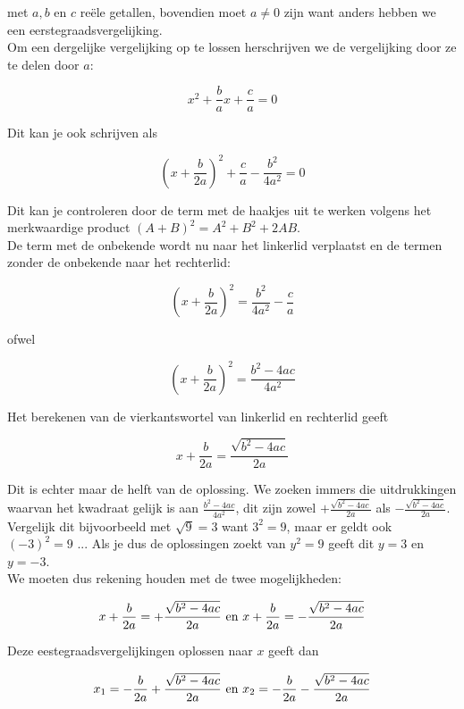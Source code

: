 met $a,b$ en $c$ re\"{e}le getallen, bovendien moet $a \neq 0$ zijn want anders hebben we een eerstegraadsvergelijking.\\
Om een dergelijke vergelijking op te lossen herschrijven we de vergelijking door ze te delen door $a$:

\[ x^2 + \frac{b}{a}x + \frac{c}{a} = 0 \]

Dit kan je ook schrijven als

\[ (x+ \frac{b}{2a})^2 + \frac{c}{a} - \frac{b^2}{4a^2} = 0 \]

Dit kan je controleren door de term met de haakjes uit te werken volgens het merkwaardige product $(A+B)^2 =A^2 + B^2 + 2AB $.\\
De term met de onbekende wordt nu naar het linkerlid verplaatst en de termen zonder de onbekende naar het rechterlid:

\[  (x+ \frac{b}{2a})^2 = \frac{b^2}{4a^2} - \frac{c}{a} \]

ofwel

\[ (x+ \frac{b}{2a})^2 = \frac{b^2 - 4ac}{4a^2} \]

Het berekenen van de vierkantswortel van linkerlid en rechterlid geeft

\[ x+\frac{b}{2a} = \frac{\sqrt{b^2 - 4ac}}{2a} \]

Dit is echter maar de helft van de oplossing. We zoeken immers die uitdrukkingen waarvan het kwadraat gelijk is aan $\frac{b^2 - 4ac}{4a^2}$, dit zijn zowel $+\frac{\sqrt{b^2 - 4ac}}{2a}$ als $-\frac{\sqrt{b^2 - 4ac}}{2a}$. Vergelijk dit bijvoorbeeld met $\sqrt{9}=3$ want $3^2 =9$, maar er geldt ook $(-3)^2 =9$ ... Als je dus de oplossingen zoekt van $y^2 =9$ geeft dit $y=3$ en $y=-3$. \\
We moeten dus rekening houden met de twee mogelijkheden:

\[ x+\frac{b}{2a} = + \frac{\sqrt{b^2 - 4ac}}{2a} \textup{  en  } x+\frac{b}{2a} = - \frac{\sqrt{b^2 - 4ac}}{2a} \]

Deze eestegraadsvergelijkingen oplossen naar $x$ geeft dan

\[ x_{1}=-\frac{b}{2a}+ \frac{\sqrt{b^2 - 4ac}}{2a} \textup{  en  } x_{2}=-\frac{b}{2a}- \frac{\sqrt{b^2 - 4ac}}{2a} \]

